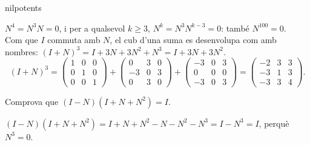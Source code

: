 \begin{apartats}
\begin{tria}{nilpotents}
\begin{solucio}
$N^4=N^3N=0$, i per a qualsevol $k\ge3$, $N^k=N^3N^{k-3}=0$: també $N^{100}=0$.\\
Com que $I$ commuta amb $N$, el cub d'una suma es desenvolupa com amb nombres:
$(I+N)^3=I+3N+3N^2+N^3=I+3N+3N^2$.
\[
(I+N)^3=\begin{pmatrix}1&0&0\\0&1&0\\0&0&1\end{pmatrix}+\begin{pmatrix}0&3&0\\-3&0&3\\0&3&0\end{pmatrix}
+\begin{pmatrix}-3&0&3\\0&0&0\\-3&0&3\end{pmatrix}=\begin{pmatrix}-2&3&3\\-3&1&3\\-3&3&4\end{pmatrix}.
\]
\end{solucio}
\end{tria}

\begin{nomesllarg}
Comprova que $(I-N)(I+N+N^2)=I$.

\begin{solucio}
$(I-N)(I+N+N^2)=I+N+N^2-N-N^2-N^3=I-N^3=I$, perquè $N^3=0$.
\end{solucio}
\end{nomesllarg}

\end{apartats}
